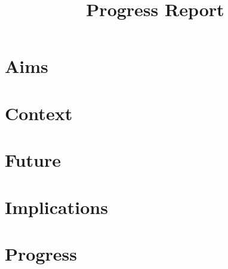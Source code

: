 \documentclass{article}
\begin{document}
            \title{Progress Report}
            \maketitle

            \section{Aims}
            {}

            \section{Context}
            {}

            \section{Future}
            {}

            \section{Implications}
            {}

            \section{Progress}
            {}

            
\end{document}
